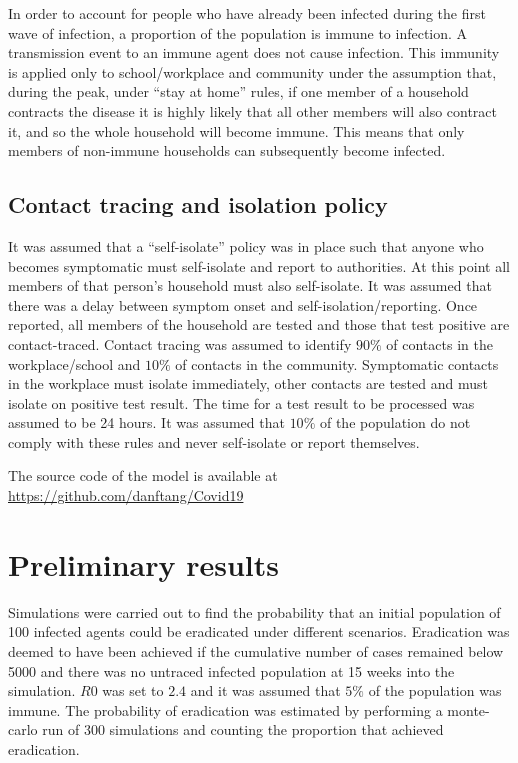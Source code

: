 \documentclass{article}
\begin{document}
In order to account for people who have already been infected during the first wave of infection, a proportion of the population is immune to infection. A transmission event to an immune agent does not cause infection. This immunity is applied only to school/workplace and community under the assumption that, during the peak, under ``stay at home'' rules, if one member of a household contracts the disease it is highly likely that all other members will also contract it, and so the whole household will become immune. This means that only members of non-immune households can subsequently become infected.

\subsection{Contact tracing and isolation policy}

It was assumed that a ``self-isolate'' policy was in place such that anyone who becomes symptomatic must self-isolate and report to authorities. At this point all members of that person's household must also self-isolate. It was assumed that there was a delay between symptom onset and self-isolation/reporting. Once reported, all members of the household are tested and those that test positive are contact-traced. Contact tracing was assumed to identify $90\%$ of contacts in the workplace/school and $10\%$ of contacts in the community. Symptomatic contacts in the workplace must isolate immediately, other contacts are tested and must isolate on positive test result. The time for a test result to be processed was assumed to be 24 hours. It was assumed that $10\%$ of the population do not comply with these rules and never self-isolate or report themselves.

The source code of the model is available at \href{https://github.com/danftang/Covid19}{https://github.com/danftang/Covid19}

\section{Preliminary results}

Simulations were carried out to find the probability that an initial population of 100 infected agents could be eradicated under different scenarios. Eradication was deemed to have been achieved if the cumulative number of cases remained below 5000 and there was no untraced infected population at 15 weeks into the simulation. $R0$ was set to $2.4$\cite{ferguson2020impact} and it was assumed that $5\%$ of the population was immune. The probability of eradication was estimated by performing a monte-carlo run of 300 simulations and counting the proportion that achieved eradication.
\end{document}
